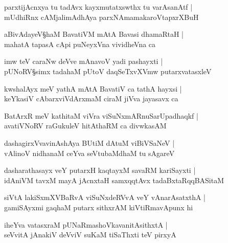 \begin{shloka}
parxtijAcnxya tu tadAvx kayxmutatxswthx tu varAsanAtf |\\
mUdhiRnx cAMjalimAdhAya parxNAmamakaroVtapxrXBuH 
\end{shloka}

\begin{shloka}
aBivAdayeV\S haM BavatiVM mAtA Bavasi dhamaRtaH |\\
mahatA tapasA cApi puNeyxVna vividheVna ca 
\end{shloka}

\begin{shloka}
imw teV caraNw deVve mAnavoV yadi pashayxti |\\
pUNoRV\S simx tadahaM pUtoV daqSeTxvXVmw putarxvatasxleV 
\end{shloka}

\begin{shloka}
kwshalAyx meV yathA mAtA BavatiV ca tathA hayxsi |\\
keYkasiV cAbarxviVdArxmaM ciraM jiVva jayasavx ca 
\end{shloka}

\begin{shloka}
BatArxR meV kathitaM viVra viSuNxmARnuSarUpadhaqkf |\\
avatiVNoRV raGukuleV hitAthaRM ca divwkasAM 
\end{shloka}

\begin{shloka}
dashagirxVvavinAshAya BUtiM dAtuM viBiVSaNeV |\\
vAlinoV nidhanaM ceYva seVtubaMdhaM tu sAgareV 
\end{shloka}

\begin{shloka}
dasharathasayx veY putarxH kaqtayxM savaRM kariSayxti |\\
idAniVM tavxM mayA jAcnxtaH samxqqtAvx tadaBxtaRqqBASitaM 
\end{shloka}

\begin{shloka}
siVtA lakiSxmXVBaRvA\R{} viSuNxdeRVvA veY vAnarAsatxthA |\\
gamiSAyxmi gaqhaM putarx sithxrAM kiVtiRmavApunx hi 
\end{shloka}

\begin{shloka}
iheYva vatasxraM pUNaRmashoVkavanitAsithxtA |\\
seVvitA jAnakiV deVviV suKaM tiSaThxti teV pirxyA
\end{shloka}


